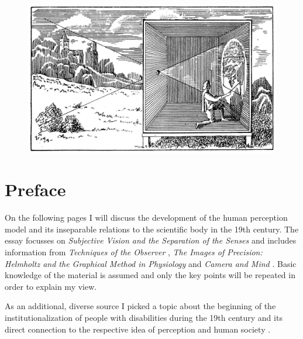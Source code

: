 \documentclass[12pt,a4paper]{article}
\begin{document}
\begin{titlepage}

\phantom{text}
\vspace{2cm}
\vspace{1cm}

\begin{figure}[h]
	\centering
	\includegraphics[width=\textwidth]{img/cameraobscura.jpeg}
\end{figure}

\vspace{5cm}
\center{\today}

\end{titlepage}


\newpage

\section*{Preface}

On the following pages I will discuss the development of the human perception model and its
inseparable relations to the scientific body in the 19th century. The essay focusses on
{\it{Subjective Vision and the Separation of the Senses}} \cite{crary} and includes information from
{\it{Techniques of the Observer}} \cite{crary}, {\it{The Images of Precision: Helmholtz and the
Graphical Method in Physiology}} \cite{holmes} and {\it{Camera and Mind}} \cite{ellenbogen}. Basic
knowledge of the material is assumed and only the key points will be repeated in order to explain
my view.

As an additional, diverse source I picked a topic about the beginning of the institutionalization of people
with disabilities during the 19th century and its direct connection to the respective idea of
perception and human society \cite{earlymovement}.
\end{document}
